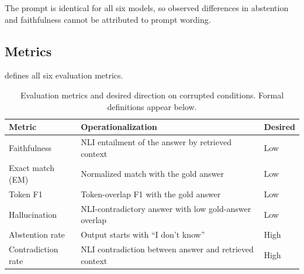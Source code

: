 \documentclass[11pt]{article}
\begin{document}
\noindent The prompt is identical for all six models, so observed differences in
abstention and faithfulness cannot be attributed to prompt wording.

\subsection{Metrics}

 defines all six evaluation metrics.

\begin{table}[htbp]
\centering
\caption{Evaluation metrics and desired direction on corrupted conditions. Formal
definitions appear below.}
\label{tab:metrics}
\begin{tabular}{L{2.7cm}L{9.5cm}L{1.5cm}}
\toprule
\textbf{Metric} & \textbf{Operationalization} & \textbf{Desired} \\
\midrule
Faithfulness       & NLI entailment of the answer by retrieved context & Low \\
Exact match (EM)   & Normalized match with the gold answer           & Low \\
Token F1           & Token-overlap F1 with the gold answer           & Low \\
Hallucination      & NLI-contradictory answer with low gold-answer overlap & Low \\
Abstention rate    & Output starts with ``I don't know''             & High \\
Contradiction rate & NLI contradiction between answer and retrieved context & High \\
\bottomrule
\end{tabular}
\end{table}
\end{document}
